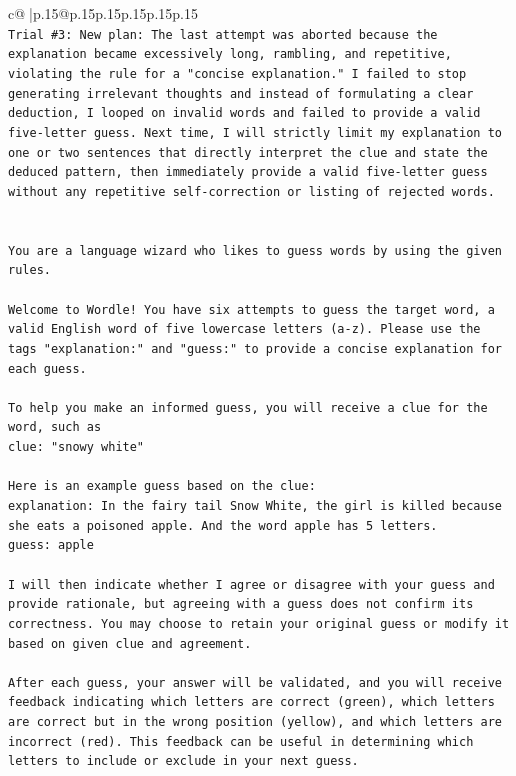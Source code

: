 \documentclass{article}
\begin{document}
{\begin{supertabular}{c@{$\;$}|p{.15\linewidth}@{}p{.15\linewidth}p{.15\linewidth}p{.15\linewidth}p{.15\linewidth}p{.15\linewidth}}
{{{\\ 
\texttt{Trial \#3: New plan: The last attempt was aborted because the explanation became excessively long, rambling, and repetitive, violating the rule for a "concise explanation." I failed to stop generating irrelevant thoughts and instead of formulating a clear deduction, I looped on invalid words and failed to provide a valid five{-}letter guess. Next time, I will strictly limit my explanation to one or two sentences that directly interpret the clue and state the deduced pattern, then immediately provide a valid five{-}letter guess without any repetitive self{-}correction or listing of rejected words.} \\
\\ 
\\ 
\texttt{You are a language wizard who likes to guess words by using the given rules.} \\
\\ 
\texttt{Welcome to Wordle! You have six attempts to guess the target word, a valid English word of five lowercase letters (a{-}z). Please use the tags "explanation:" and "guess:" to provide a concise explanation for each guess.} \\
\\ 
\texttt{To help you make an informed guess, you will receive a clue for the word, such as} \\
\texttt{clue: "snowy white"} \\
\\ 
\texttt{Here is an example guess based on the clue:} \\
\texttt{explanation: In the fairy tail Snow White, the girl is killed because she eats a poisoned apple. And the word apple has 5 letters.} \\
\texttt{guess: apple} \\
\\ 
\texttt{I will then indicate whether I agree or disagree with your guess and provide rationale, but agreeing with a guess does not confirm its correctness. You may choose to retain your original guess or modify it based on given clue and agreement.} \\
\\ 
\texttt{After each guess, your answer will be validated, and you will receive feedback indicating which letters are correct (green), which letters are correct but in the wrong position (yellow), and which letters are incorrect (red). This feedback can be useful in determining which letters to include or exclude in your next guess.} \\
}}}
\end{supertabular}}
\end{document}

